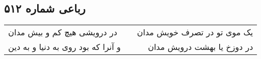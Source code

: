 \begin{center}
\section*{رباعی شماره ۵۱۲}
\label{sec:sh512}
\begin{longtable}{l p{0.5cm} r}
در درویشی هیچ کم و بیش مدان
&&
یک موی تو در تصرف خویش مدان
\\
و آنرا که بود روی به دنیا و به دین
&&
در دوزخ یا بهشت درویش مدان
\\
\end{longtable}
\end{center}
